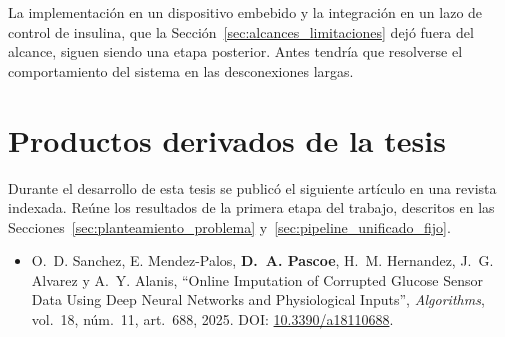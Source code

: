 \documentclass{report}
\begin{document}
La implementación en un dispositivo embebido y la integración en un lazo de control de insulina, que la Sección~\ref{sec:alcances_limitaciones} dejó fuera del alcance, siguen siendo una etapa posterior. Antes tendría que resolverse el comportamiento del sistema en las desconexiones largas.





\appendix
\chapter{Productos derivados de la tesis}
\label{ap:productos}

Durante el desarrollo de esta tesis se publicó el siguiente artículo en una revista indexada. Reúne los resultados de la primera etapa del trabajo, descritos en las Secciones~\ref{sec:planteamiento_problema} y~\ref{sec:pipeline_unificado_fijo}.

\begin{itemize}[leftmargin=*]
    \item O.~D. Sanchez, E. Mendez-Palos, \textbf{D.~A. Pascoe}, H.~M. Hernandez, J.~G. Alvarez y A.~Y. Alanis, ``Online Imputation of Corrupted Glucose Sensor Data Using Deep Neural Networks and Physiological Inputs'', \textit{Algorithms}, vol.~18, núm.~11, art.~688, 2025. DOI: \href{https://doi.org/10.3390/a18110688}{10.3390/a18110688}.
\end{itemize}
\end{document}
